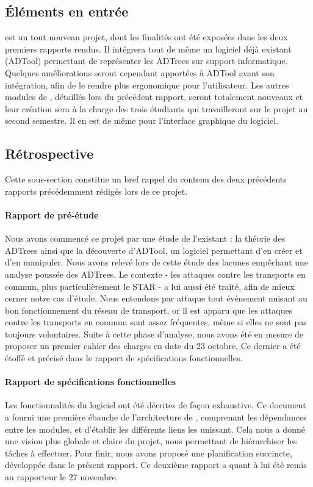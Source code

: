	\subsection{Éléments en entrée}

	\glasir{} est un tout nouveau projet, dont les finalités ont été exposées dans les deux premiers rapports rendus. Il intégrera tout de même un logiciel déjà existant (ADTool) permettant de représenter les ADTrees sur support informatique. Quelques améliorations seront cependant apportées à ADTool avant son intégration, afin de le rendre plus ergonomique pour l'utilisateur. Les autres modules de \glasir{}, détaillés lors du précédent rapport, seront totalement nouveaux et leur création sera à la charge des trois étudiants qui travailleront sur le projet au second semestre. Il en est de même pour l'interface graphique du logiciel.

	\subsection{Rétrospective} 

	Cette sous-section constitue un bref rappel du contenu des deux précédents rapports précédemment rédigés lors de ce projet.

	\paragraph{Rapport de pré-étude} %
	 Nous avons commencé ce projet par une étude de l'existant : la théorie des ADTrees ainsi que la découverte d'ADTool, un logiciel permettant d'en créer et d'en manipuler. Nous avons relevé lors de cette étude des lacunes empêchant une analyse poussée des ADTrees. Le contexte - les attaques contre les transports en commun, plus particulièrement le STAR - a lui aussi été traité, afin de mieux cerner notre cas d'étude. Nous entendons par \og attaque \fg{} tout événement nuisant au bon fonctionnement du réseau de transport, or il est apparu que les attaques contre les transports en commun sont assez fréquentes, même si elles ne sont pas toujours volontaires. Suite à cette phase d'analyse, nous avons été en mesure de proposer un premier cahier des charges en date du 23 octobre. Ce dernier a été étoffé et précisé dans le rapport de spécifications fonctionnelles. %

	\paragraph{Rapport de spécifications fonctionnelles} %
	Les fonctionnalités du logiciel ont été décrites de façon exhaustive. Ce document a fourni une première ébauche de l'architecture de \glasir{}, comprenant les dépendances entre les modules, et d'établir les différents liens les unissant. Cela nous a donné une vision plus globale et claire du projet, nous permettant de hiérarchiser les tâches à effectuer. Pour finir, nous avons proposé une planification succincte, développée dans le présent rapport. Ce deuxième rapport a quant à lui été remis au rapporteur le 27 novembre.

